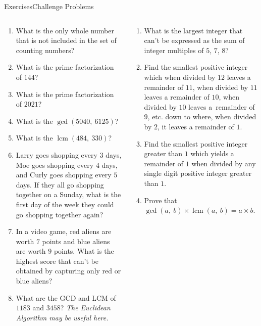 \documentclass[9pt,aspectratio=169]{beamer}
\DeclareMathOperator{\lcm}{lcm}
\begin{document}
\begin{frame}{Exercises\hspace*{0.35\textwidth}Challenge Problems}
  \begin{columns}[T]
    \begin{column}{0.52\textwidth}
      \begin{enumerate}
        \item What is the only whole number that is not included in the set of counting numbers?
        \item What is the prime factorization of $144$?
        \item What is the prime factorization of $2021$?
        \item What is the $\gcd(5040,\ 6125)$?
        \item What is the $\lcm(484,\ 330)$?
        \item Larry goes shopping every $3$ days, Moe goes shopping every $4$ days, and Curly goes shopping every $5$ days.  If they all go shopping together on a Sunday, what is the first day of the week they could go shopping together again?
        \item In a video game, red aliens are worth $7$ points and blue aliens are worth $9$ points.  What is the highest score that can’t be obtained by capturing only red or blue aliens?
        \item What are the GCD and LCM of $1183$ and $3458$? \emph{The Euclidean Algorithm may be useful here.}
      \end{enumerate}
    \end{column}
    \begin{column}{0.48\textwidth}
      \begin{enumerate}
        \item What is the largest integer that can’t be expressed as the sum of integer multiples of $5$, $7$, $8$?

        \item Find the smallest positive integer which when divided by $12$ leaves a remainder of $11$, when divided by $11$ leaves a remainder of $10$, when divided by $10$ leaves a~remainder of $9$, etc. down to where, when divided by $2$, it leaves a remainder of $1$.

        \item Find the smallest positive integer greater than $1$ which yields a remainder of $1$ when divided by any single digit positive integer greater than $1$.
        
        \item Prove that $\gcd(a,\ b) \times \lcm(a,\ b) = a \times b$.
      \end{enumerate}
    \end{column}
  \end{columns}
\end{frame}

\end{document}
